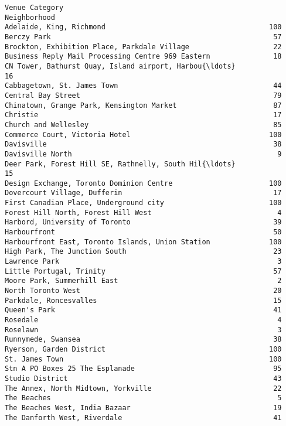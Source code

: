 \documentclass[11pt]{article}
\begin{document}
\begin{tcolorbox}[breakable, size=fbox, boxrule=.5pt, pad at break*=1mm, opacityfill=0]
\begin{Verbatim}[commandchars=\\\{\}]
                                                    Venue Category
Neighborhood
Adelaide, King, Richmond                                       100
Berczy Park                                                     57
Brockton, Exhibition Place, Parkdale Village                    22
Business Reply Mail Processing Centre 969 Eastern               18
CN Tower, Bathurst Quay, Island airport, Harbou{\ldots}              16
Cabbagetown, St. James Town                                     44
Central Bay Street                                              79
Chinatown, Grange Park, Kensington Market                       87
Christie                                                        17
Church and Wellesley                                            85
Commerce Court, Victoria Hotel                                 100
Davisville                                                      38
Davisville North                                                 9
Deer Park, Forest Hill SE, Rathnelly, South Hil{\ldots}              15
Design Exchange, Toronto Dominion Centre                       100
Dovercourt Village, Dufferin                                    17
First Canadian Place, Underground city                         100
Forest Hill North, Forest Hill West                              4
Harbord, University of Toronto                                  39
Harbourfront                                                    50
Harbourfront East, Toronto Islands, Union Station              100
High Park, The Junction South                                   23
Lawrence Park                                                    3
Little Portugal, Trinity                                        57
Moore Park, Summerhill East                                      2
North Toronto West                                              20
Parkdale, Roncesvalles                                          15
Queen's Park                                                    41
Rosedale                                                         4
Roselawn                                                         3
Runnymede, Swansea                                              38
Ryerson, Garden District                                       100
St. James Town                                                 100
Stn A PO Boxes 25 The Esplanade                                 95
Studio District                                                 43
The Annex, North Midtown, Yorkville                             22
The Beaches                                                      5
The Beaches West, India Bazaar                                  19
The Danforth West, Riverdale                                    41
\end{Verbatim}
\end{tcolorbox}
        
\end{document}
